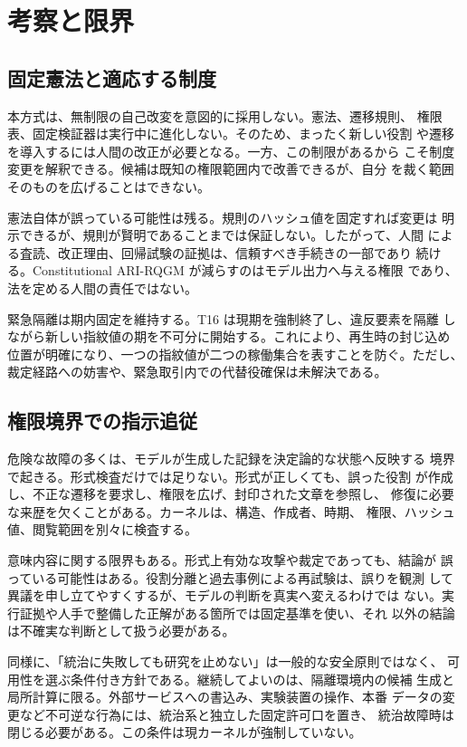 \section{考察と限界}\label{sec:discussion}

\subsection{固定憲法と適応する制度}\label{sec:discussion:p2}

本方式は、無制限の自己改変を意図的に採用しない。憲法、遷移規則、
権限表、固定検証器は実行中に進化しない。そのため、まったく新しい役割
や遷移を導入するには人間の改正が必要となる。一方、この制限があるから
こそ制度変更を解釈できる。候補は既知の権限範囲内で改善できるが、自分
を裁く範囲そのものを広げることはできない。

憲法自体が誤っている可能性は残る。規則のハッシュ値を固定すれば変更は
明示できるが、規則が賢明であることまでは保証しない。したがって、人間
による査読、改正理由、回帰試験の証拠は、信頼すべき手続きの一部であり
続ける。Constitutional ARI-RQGM が減らすのはモデル出力へ与える権限
であり、法を定める人間の責任ではない。

緊急隔離は期内固定を維持する。T16 は現期を強制終了し、違反要素を隔離
しながら新しい指紋値の期を不可分に開始する。これにより、再生時の封じ込め
位置が明確になり、一つの指紋値が二つの稼働集合を表すことを防ぐ。ただし、
裁定経路への妨害や、緊急取引内での代替役確保は未解決である。

\subsection{権限境界での指示追従}\label{sec:discussion:seams}

危険な故障の多くは、モデルが生成した記録を決定論的な状態へ反映する
境界で起きる。形式検査だけでは足りない。形式が正しくても、誤った役割
が作成し、不正な遷移を要求し、権限を広げ、封印された文章を参照し、
修復に必要な来歴を欠くことがある。カーネルは、構造、作成者、時期、
権限、ハッシュ値、閲覧範囲を別々に検査する。

意味内容に関する限界もある。形式上有効な攻撃や裁定であっても、結論が
誤っている可能性はある。役割分離と過去事例による再試験は、誤りを観測
して異議を申し立てやすくするが、モデルの判断を真実へ変えるわけでは
ない。実行証拠や人手で整備した正解がある箇所では固定基準を使い、それ
以外の結論は不確実な判断として扱う必要がある。

同様に、「統治に失敗しても研究を止めない」は一般的な安全原則ではなく、
可用性を選ぶ条件付き方針である。継続してよいのは、隔離環境内の候補
生成と局所計算に限る。外部サービスへの書込み、実験装置の操作、本番
データの変更など不可逆な行為には、統治系と独立した固定許可口を置き、
統治故障時は閉じる必要がある。この条件は現カーネルが強制していない。

